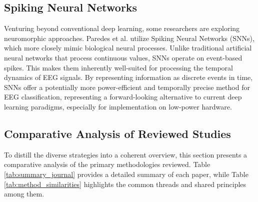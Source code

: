 \documentclass[conference]{IEEEtran}
\begin{document}
\subsection{Spiking Neural Networks}
Venturing beyond conventional deep learning, some researchers are exploring neuromorphic approaches. Paredes et al. \cite{b5} utilize Spiking Neural Networks (SNNs), which more closely mimic biological neural processes. Unlike traditional artificial neural networks that process continuous values, SNNs operate on event-based spikes. This makes them inherently well-suited for processing the temporal dynamics of EEG signals. By representing information as discrete events in time, SNNs offer a potentially more power-efficient and temporally precise method for EEG classification, representing a forward-looking alternative to current deep learning paradigms, especially for implementation on low-power hardware.

\subsection{Comparative Analysis of Reviewed Studies}
To distill the diverse strategies into a coherent overview, this section presents a comparative analysis of the primary methodologies reviewed. Table \ref{tab:summary_journal} provides a detailed summary of each paper, while Table \ref{tab:method_similarities} highlights the common threads and shared principles among them.
\end{document}
